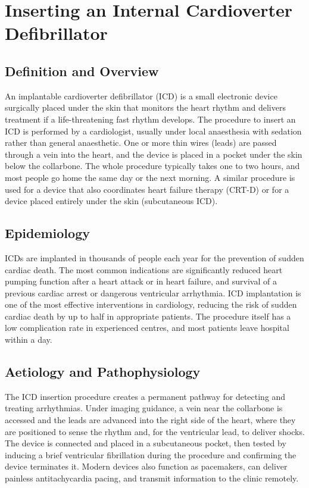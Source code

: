 \chapter{Inserting an Internal Cardioverter Defibrillator}

\section*{Definition and Overview}
An implantable cardioverter defibrillator (ICD) is a small electronic device surgically placed under the skin that monitors the heart rhythm and delivers treatment if a life-threatening fast rhythm develops. The procedure to insert an ICD is performed by a cardiologist, usually under local anaesthesia with sedation rather than general anaesthetic. One or more thin wires (leads) are passed through a vein into the heart, and the device is placed in a pocket under the skin below the collarbone. The whole procedure typically takes one to two hours, and most people go home the same day or the next morning. A similar procedure is used for a device that also coordinates heart failure therapy (CRT-D) or for a device placed entirely under the skin (subcutaneous ICD).

\section*{Epidemiology}
ICDs are implanted in thousands of people each year for the prevention of sudden cardiac death. The most common indications are significantly reduced heart pumping function after a heart attack or in heart failure, and survival of a previous cardiac arrest or dangerous ventricular arrhythmia. ICD implantation is one of the most effective interventions in cardiology, reducing the risk of sudden cardiac death by up to half in appropriate patients. The procedure itself has a low complication rate in experienced centres, and most patients leave hospital within a day.

\section*{Aetiology and Pathophysiology}
The ICD insertion procedure creates a permanent pathway for detecting and treating arrhythmias. Under imaging guidance, a vein near the collarbone is accessed and the leads are advanced into the right side of the heart, where they are positioned to sense the rhythm and, for the ventricular lead, to deliver shocks. The device is connected and placed in a subcutaneous pocket, then tested by inducing a brief ventricular fibrillation during the procedure and confirming the device terminates it. Modern devices also function as pacemakers, can deliver painless antitachycardia pacing, and transmit information to the clinic remotely.

